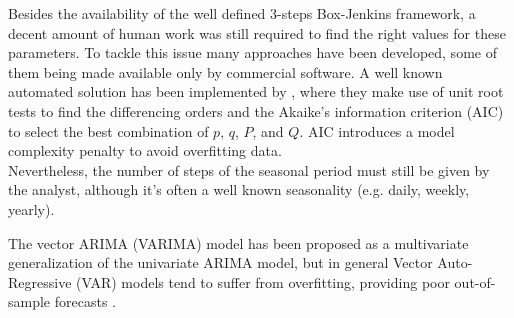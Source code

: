 \documentclass[a4paper, 12pt]{article} %
\begin{document}
	Besides the availability of the well defined 3-steps Box-Jenkins framework, a decent amount of human work was still required to find the right values for these parameters. To tackle this issue many approaches have been developed, some of them being made available only by commercial software.  A well known automated solution has been implemented by \cite{AutoForecasting}, where they make use of unit root tests to find the differencing orders and the Akaike's information criterion (AIC) to select the best combination of $p$, $q$, $P$, and $Q$. AIC introduces a model complexity penalty to avoid overfitting data.\\
	Nevertheless, the number of steps of the seasonal period must still be given by the analyst, although it's often a well known seasonality (e.g. daily, weekly, yearly).
		
	The vector ARIMA (VARIMA) model has been proposed as a multivariate generalization of the univariate ARIMA model, but in general Vector Auto-Regressive (VAR) models tend to suffer from overfitting, providing poor out-of-sample forecasts \cite{25YearsForecasting}.
	
\end{document}
